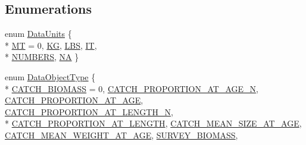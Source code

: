 \subsection*{Enumerations}
\begin{DoxyCompactItemize}
\item 
enum \hyperlink{namespacemas_a7e15982b9bc2fc35b571bceea4f85a6b}{Data\-Units} \{ \\*
\hyperlink{namespacemas_a7e15982b9bc2fc35b571bceea4f85a6ba24ba23cbe986514f8d11f362fa3930fa}{M\-T} = 0, 
\hyperlink{namespacemas_a7e15982b9bc2fc35b571bceea4f85a6ba717fa60c06e10278cbb6af9c89846204}{K\-G}, 
\hyperlink{namespacemas_a7e15982b9bc2fc35b571bceea4f85a6ba83f219df1658ee24c04b5aae8be3e9b4}{L\-B\-S}, 
\hyperlink{namespacemas_a7e15982b9bc2fc35b571bceea4f85a6ba9f88b87b3a94ede2bf085ae719c5d264}{I\-T}, 
\\*
\hyperlink{namespacemas_a7e15982b9bc2fc35b571bceea4f85a6baae97c65d42e8b626638c1de602c1a666}{N\-U\-M\-B\-E\-R\-S}, 
\hyperlink{namespacemas_a7e15982b9bc2fc35b571bceea4f85a6ba3ad4cc78219ff2bb2190866ab0bfe269}{N\-A}
 \}
\item 
enum \hyperlink{namespacemas_a011cdbd288b3370538941f20c874de27}{Data\-Object\-Type} \{ \\*
\hyperlink{namespacemas_a011cdbd288b3370538941f20c874de27a91e0c09d0a7c65d6d0d871d57c069354}{C\-A\-T\-C\-H\-\_\-\-B\-I\-O\-M\-A\-S\-S} = 0, 
\hyperlink{namespacemas_a011cdbd288b3370538941f20c874de27a8835020daf124e9224f6b47bcac9fc25}{C\-A\-T\-C\-H\-\_\-\-P\-R\-O\-P\-O\-R\-T\-I\-O\-N\-\_\-\-A\-T\-\_\-\-A\-G\-E\-\_\-\-N}, 
\hyperlink{namespacemas_a011cdbd288b3370538941f20c874de27ac1ac07dc7b7ffd0749afe5212fc072d6}{C\-A\-T\-C\-H\-\_\-\-P\-R\-O\-P\-O\-R\-T\-I\-O\-N\-\_\-\-A\-T\-\_\-\-A\-G\-E}, 
\hyperlink{namespacemas_a011cdbd288b3370538941f20c874de27a9d0db3c48ce40586e86c9c8e6958999c}{C\-A\-T\-C\-H\-\_\-\-P\-R\-O\-P\-O\-R\-T\-I\-O\-N\-\_\-\-A\-T\-\_\-\-L\-E\-N\-G\-T\-H\-\_\-\-N}, 
\\*
\hyperlink{namespacemas_a011cdbd288b3370538941f20c874de27a13505e72234d2fba94fda6c2ce2a8910}{C\-A\-T\-C\-H\-\_\-\-P\-R\-O\-P\-O\-R\-T\-I\-O\-N\-\_\-\-A\-T\-\_\-\-L\-E\-N\-G\-T\-H}, 
\hyperlink{namespacemas_a011cdbd288b3370538941f20c874de27a9477c55e49a0032670dfc591cd8531b2}{C\-A\-T\-C\-H\-\_\-\-M\-E\-A\-N\-\_\-\-S\-I\-Z\-E\-\_\-\-A\-T\-\_\-\-A\-G\-E}, 
\hyperlink{namespacemas_a011cdbd288b3370538941f20c874de27ac327e723f8878231018c79af30448e6e}{C\-A\-T\-C\-H\-\_\-\-M\-E\-A\-N\-\_\-\-W\-E\-I\-G\-H\-T\-\_\-\-A\-T\-\_\-\-A\-G\-E}, 
\hyperlink{namespacemas_a011cdbd288b3370538941f20c874de27a032bff9d6483e4a2e6a2bcf073ee8964}{S\-U\-R\-V\-E\-Y\-\_\-\-B\-I\-O\-M\-A\-S\-S}, 

\end{DoxyCompactItemize}
